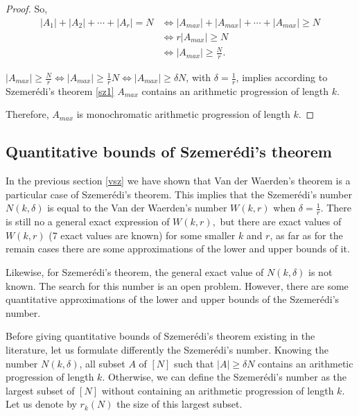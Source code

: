 \begin{proof}
So, \begin{align*}
|A_1|+|A_2|+ \cdots +|A_r|=N & \Longleftrightarrow |A_{max}|+|A_{max}|+ \cdots +|A_{max}| \geq N \\  & \Longleftrightarrow r|A_{max}| \geq N \\
& \Longleftrightarrow |A_{max}| \geq \frac{N}{r}.
\end{align*}

$|A_{max}| \geq \frac{N}{r} \Longleftrightarrow |A_{max}| \geq \frac{1}{r} N \Longleftrightarrow |A_{max}| \geq \delta N$, with $\delta = \frac{1}{r}$, implies according to Szemerédi's theorem \eqref{sz1} $A_{max}$  contains an arithmetic progression of length $k.$

Therefore, $A_{max}$ is monochromatic arithmetic progression of length $k.$
\end{proof}

\subsection{Quantitative bounds of Szemerédi's theorem}

In the previous section \eqref{vsz} we have shown that Van der Waerden's theorem is a particular case of Szemerédi's theorem. This implies that the Szemerédi's number $N(k, \delta)$ is equal to the Van der Waerden's number $W(k,r)$ when $\delta=\frac{1}{r}.$
There is still no a general exact expression of $W(k,r),$ but there are exact values of $W(k,r)$ (7 exact values are known) for some smaller $k$ and $r$, as far as for the remain cases there are some  approximations of the lower and upper bounds of it. 

Likewise, for Szemerédi's theorem, the general exact value of $N(k, \delta)$ is not known. The search for this number is an open problem. However, there are some quantitative approximations of the lower and upper bounds of the Szemerédi's number.  

Before giving quantitative bounds of Szemerédi's theorem existing in the literature, let us formulate differently the Szemerédi's number. Knowing the number $N(k, \delta)$, all subset $A$ of $[N]$ such that $|A|\geq \delta N$ contains an arithmetic progression of length $k.$ Otherwise, we can define the Szemerédi's number as the largest subset of $[N]$ without containing an arithmetic progression of length $k.$ Let us denote by $r_k(N)$ the size of this largest subset. 

